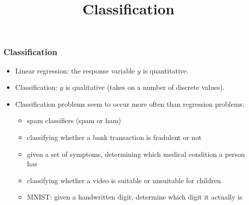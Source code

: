 \documentclass[xcolor=table]{beamer}
\title{Classification}
\begin{document}
\maketitle

\begin{frame}[t]
  \frametitle{Classification}  
\begin{itemize}
    \item Linear regression: the response variable $y$ is quantitative.
    \item Classification: $y$ is qualitative (takes on a number of discrete values).
    \item Classification problems seem to occur more often than regression problems:
		\begin{itemize}    
    		\item spam classifiers (spam or ham)
    		\item classifying whether a bank transaction is fradulent or not
    		\item given a set of symptoms, determining which medical condition a person has
    		\item classifying whether a video is suitable or unsuitable for children
    		\item MNIST: given a handwritten digit, determine which digit it actually is
    	\end{itemize} 
  \end{itemize}
\end{frame}
\end{document}
